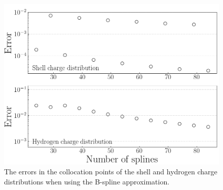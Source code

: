 \documentclass[twocolumn]{article}
\begin{document}
\begin{large}
\begin{figure}[t!]
    \includegraphics[scale=0.35]{Errors.png}
    \caption{The errors in the collocation points of the shell and hydrogen charge distributions when using the B-spline approximation.}
    \label{17apr0946}
\end{figure}













\end{large}
\end{document}
